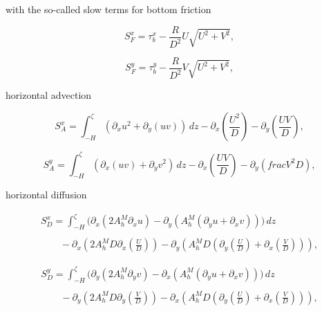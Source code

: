 with the so-called slow terms 
for bottom friction

\begin{equation}\label{Slowfirst}
S^x_{F}=\tau^x_b-\frac{R}{D^2}U\sqrt{U^2+V^2},
\end{equation}

\begin{equation}\label{Slowsecond}
S^y_{F}=\tau^y_b-\frac{R}{D^2}V\sqrt{U^2+V^2},
\end{equation}

horizontal advection

\begin{equation}\label{SxA}
S^x_{A}=\int_{-H}^{\zeta}\left(\partial_x u^2+\partial_y(uv)\right)\,dz-
\partial_x\left(\frac{U^2}{D}\right)-\partial_y\left(\frac{UV}{D}\right),
\end{equation}

\begin{equation}\label{SyA} 
S^y_{A}=\int_{-H}^{\zeta}\left(\partial_x (uv)+\partial_yv^2\right)\,dz-
\partial_x\left(\frac{UV}{D}\right)-\partial_y\left(frac{V^2}{D}\right),
\end{equation}

horizontal diffusion

\begin{equation}\label{SxD}
\begin{array}{l}
\displaystyle
S^x_D=
\int_{-H}^{\zeta}\big(
\partial_x\left(2A_h^M\partial_xu\right)-\partial_y\left(A_h^M
(\partial_yu+\partial_xv)\right)\big)\,dz
\\ \\
\displaystyle\qquad 
-\partial_x\left(2A_h^MD\partial_x\left(\frac{U}{D}\right)\right)
-\partial_y\left(A_h^MD \left(\partial_y\left(\frac{U}{D}\right)
+\partial_x\left(\frac{V}{D}\right)\right)\right), 
\end{array}
\end{equation} 

\begin{equation}\label{SyD}
\begin{array}{l}
\displaystyle
S^y_D=
\int_{-H}^{\zeta}\big(
\partial_y\left(2A_h^M\partial_yv\right)-\partial_x\left(A_h^M
(\partial_yu+\partial_xv)\right)\big)\,dz
\\ \\
\displaystyle\qquad 
-\partial_y\left(2A_h^MD\partial_y\left(\frac{V}{D}\right)\right)
-\partial_x\left(A_h^MD \left(\partial_y\left(\frac{U}{D}\right)
+\partial_x\left(\frac{V}{D}\right)\right)\right), 
\end{array}
\end{equation} 

